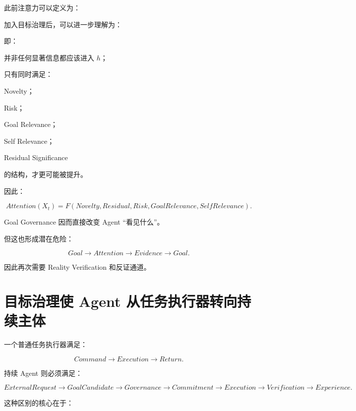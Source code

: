 此前注意力可以定义为：

\begin{statementbox}
\centering
{}
\end{statementbox}

加入目标治理后，可以进一步理解为：

\begin{statementbox}
\centering
{}
\end{statementbox}

即：

并非任何显著信息都应该进入 $h$；

只有同时满足：

Novelty；

Risk；

Goal Relevance；

Self Relevance；

Residual Significance

的结构，才更可能被提升。

因此：

\[
Attention(X_t)
=
F(
Novelty,
Residual,
Risk,
GoalRelevance,
SelfRelevance
).
\]

Goal Governance 因而直接改变 Agent ``看见什么''。

但这也形成潜在危险：

\[
Goal
\rightarrow
Attention
\rightarrow
Evidence
\rightarrow
Goal.
\]

因此再次需要 Reality Verification 和反证通道。


\section{目标治理使 Agent 从任务执行器转向持续主体}

一个普通任务执行器满足：

\[
Command
\rightarrow
Execution
\rightarrow
Return.
\]

持续 Agent 则必须满足：

\[
ExternalRequest
\rightarrow
GoalCandidate
\rightarrow
Governance
\rightarrow
Commitment
\rightarrow
Execution
\rightarrow
Verification
\rightarrow
Experience.
\]

这种区别的核心在于：

\begin{statementbox}
\centering
{}
\end{statementbox}

